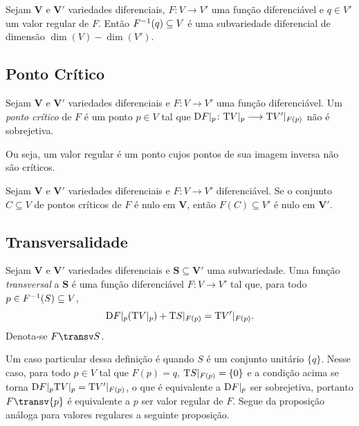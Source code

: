 \begin{prop}
Sejam $\bm V$ e $\bm V'$ variedades diferenciais, $F\colon V \to V'$ uma função diferenciável e $q \in V'$ um valor regular de $F$. Então $F^{-1}(q) \subseteq V$ é uma subvariedade diferencial de dimensão $\dim(V)-\dim(V')$.
\end{prop}

\subsection{Ponto Crítico}

\begin{defi}
Sejam $\bm V$ e $\bm V'$ variedades diferenciais e $F\colon V \to V'$ uma função diferenciável. Um \emph{ponto crítico} de $F$ é um ponto $p \in V$ tal que $\mathrm{D} F|_p\colon \mathrm{T} V|_p \longrightarrow \mathrm{T} V'|_{F(p)}$ não é sobrejetiva.
\end{defi}

Ou seja, um valor regular é um ponto cujos pontos de sua imagem inversa não são críticos.

\begin{prop}
Sejam $\bm V$ e $\bm V'$ variedades diferenciais e $F\colon V \to V'$ diferenciável. Se o conjunto $C \subseteq V$ de pontos críticos de $F$ é nulo em $\bm V$, então $F(C) \subseteq V'$ é nulo em $\bm V'$.
\end{prop}

\subsection{Transversalidade}

\begin{defi}
Sejam $\bm V$ e $\bm V'$ variedades diferenciais e $\bm S \subseteq \bm V'$ uma subvariedade. Uma função \emph{transversal} a $\bm S$ é uma função diferenciável $F\colon V \to V'$ tal que, para todo $p \in F^{-1}(S) \subseteq V$,
	\begin{equation*}
	\mathrm{D} F|_p(\mathrm{T} V|_p) + \mathrm{T} S|_{F(p)} = \mathrm{T} V'|_{F(p)}.
	\end{equation*}
Denota-se $F \transv S$.
\end{defi}

Um caso particular dessa definição é quando $S$ é um conjunto unitário $\{q\}$. Nesse caso, para todo $p \in V$ tal que $F(p)=q$,  $\mathrm{T} S|_{F(p)} = \{0\}$ e a condição acima se torna $\mathrm{D} F|_p\mathrm{T} V|_p = \mathrm{T} V'|_{F(p)}$, o que é equivalente a $\mathrm{D} F|_p$ ser sobrejetiva, portanto $F \transv \{p\}$ é equivalente a $p$ ser valor regular de $F$. Segue da proposição análoga para valores regulares a seguinte proposição.

